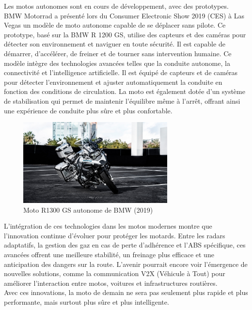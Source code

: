 Les motos autonomes sont en cours de développement, avec des prototypes. BMW Motorrad a présenté lors du Consumer Electronic Show 2019 (CES) à Las Vegas \cite{moto_autonome} un modèle de moto autonome capable de se déplacer sans pilote. Ce prototype, basé sur la BMW R 1200 GS, utilise des capteurs et des caméras pour détecter son environnement et naviguer en toute sécurité. Il est capable de démarrer, d’accélérer, de freiner et de tourner sans intervention humaine. 
Ce modèle intègre des technologies avancées telles que la conduite autonome, la connectivité et l’intelligence artificielle. Il est équipé de capteurs et de caméras pour détecter l’environnement et ajuster automatiquement la conduite en fonction des conditions de circulation. La moto est également dotée d’un système de stabilisation qui permet de maintenir l’équilibre même à l’arrêt, offrant ainsi une expérience de conduite plus sûre et plus confortable.

\begin{figure}[H]
    \centering
    \includegraphics[width=0.7\textwidth]{etat_art/images/bmw.jpeg} 
    \caption{Moto R1300 GS autonome de BMW (2019)}
\end{figure}


L’intégration de ces technologies dans les motos modernes montre que l’innovation continue d’évoluer pour protéger les motards. Entre les radars adaptatifs, la gestion des gaz en cas de perte d’adhérence et l’ABS spécifique, ces avancées offrent une meilleure stabilité, un freinage plus efficace et une anticipation des dangers sur la route. L’avenir pourrait encore voir l’émergence de nouvelles solutions, comme la communication V2X (Véhicule à Tout) pour améliorer l’interaction entre motos, voitures et infrastructures routières.\\
Avec ces innovations, la moto de demain ne sera pas seulement plus rapide et plus performante, mais surtout plus sûre et plus intelligente. 

